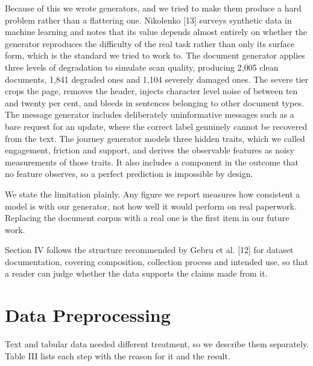 \documentclass[conference]{IEEEtran}
\begin{document}
Because of this we wrote generators, and we tried to make them produce a hard problem rather than a flattering one. Nikolenko [13] surveys synthetic data in machine learning and notes that its value depends almost entirely on whether the generator reproduces the difficulty of the real task rather than only its surface form, which is the standard we tried to work to. The document generator applies three levels of degradation to simulate scan quality, producing 2,005 clean documents, 1,841 degraded ones and 1,104 severely damaged ones. The severe tier crops the page, removes the header, injects character level noise of between ten and twenty per cent, and bleeds in sentences belonging to other document types. The message generator includes deliberately uninformative messages such as a bare request for an update, where the correct label genuinely cannot be recovered from the text. The journey generator models three hidden traits, which we called engagement, friction and support, and derives the observable features as noisy measurements of those traits. It also includes a component in the outcome that no feature observes, so a perfect prediction is impossible by design.

We state the limitation plainly. Any figure we report measures how consistent a model is with our generator, not how well it would perform on real paperwork. Replacing the document corpus with a real one is the first item in our future work.

Section IV follows the structure recommended by Gebru et al. [12] for dataset documentation, covering composition, collection process and intended use, so that a reader can judge whether the data supports the claims made from it.

\section{Data Preprocessing}
Text and tabular data needed different treatment, so we describe them separately. Table III lists each step with the reason for it and the result.
\end{document}
